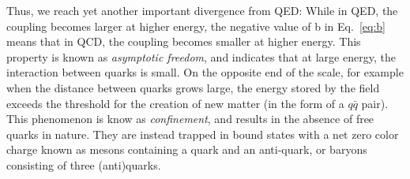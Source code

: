  Thus, we reach yet another important divergence from QED: While in QED, the coupling becomes larger at higher energy, the negative value of b in Eq.~\ref{eq:b} means that in QCD, the coupling becomes smaller at higher energy. This property is known as \textit{asymptotic freedom}, and indicates that at large energy, the interaction between quarks is small. 
  On the opposite end of the scale, for example when the distance between quarks grows large, the energy stored by the field exceeds the threshold for the creation of new matter (in the form of a $q\bar{q}$ pair). This phenomenon is know as \textit{confinement}, and results in the absence of free quarks in nature. They are instead trapped in bound states with a net zero color charge known as mesons containing a quark and an anti-quark, or baryons consisting of three (anti)quarks.

